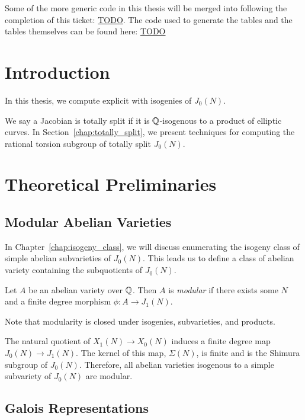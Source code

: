 \documentclass[11pt, proquest]{uwthesis}
\begin{document}
Some of the more generic code in this thesis will be merged into
\sage following the completion of this ticket: \url{TODO}. The code used to
generate the tables and the tables themselves can be found here: \url{TODO}

\chapter{Introduction}%
\label{chap:intro}

In this thesis, we compute explicit with isogenies of $J_0(N)$.

We say a Jacobian is totally split if it is $\mathbb{Q}$-isogenous to a product of
elliptic curves. In Section~\ref{chap:totally_split}, we present techniques for
computing the rational torsion subgroup of totally split $J_0(N)$.


\chapter{Theoretical Preliminaries}%
\label{chap:prelim}

\section{Modular Abelian Varieties}

In Chapter~\ref{chap:isogeny_class}, we will discuss enumerating the isogeny
class of simple abelian subvarieties of $J_0(N)$. This leads us to define a
class of abelian variety containing the subquotients of $J_0(N)$.

\begin{definition}
    \label{defn:modabvar}
    Let $A$ be an abelian variety over $\mathbb{Q}$. Then $A$ is \emph{modular} if
    there exists some $N$ and a finite degree morphism $\phi:A\to J_1(N)$.

    Note that modularity is closed under isogenies, subvarieties, and products.
\end{definition}

The natural quotient of $X_1(N)\to X_0(N)$ induces a finite degree map
$J_0(N)\to J_1(N)$. The kernel of this map, $\Sigma(N)$, is finite and is the
Shimura subgroup of $J_0(N)$. Therefore, all abelian varieties isogenous to a
simple subvariety of $J_0(N)$ are modular.


\section{Galois Representations}
\end{document}
